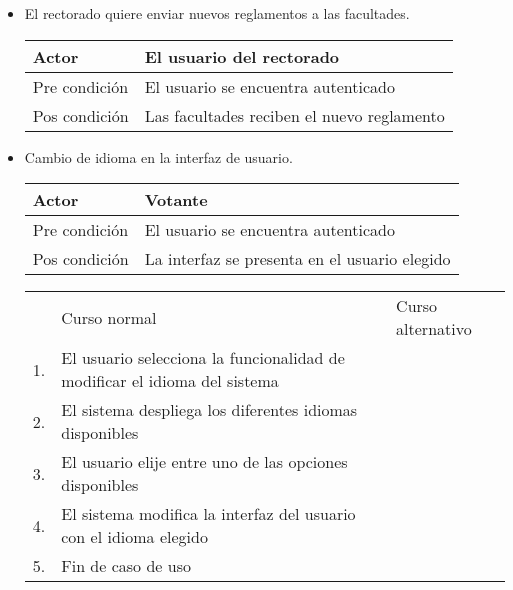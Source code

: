 \begin{itemize}
\bigskip
\item El rectorado quiere enviar nuevos reglamentos a las facultades.
\begin{center}
\begin{tabular}{ll}
Actor & El usuario del rectorado \\
\hline
Pre condici\'on & El usuario se encuentra autenticado \\
\hline
Pos condici\'on & Las facultades reciben el nuevo reglamento \\
\hline
\end{tabular}
\medskip
\end{center}

\bigskip
\item Cambio de idioma en la interfaz de usuario.
\begin{center}
\begin{tabular}{ll}
Actor & Votante \\
\hline
Pre condición & El usuario se encuentra autenticado \\
\hline
Pos condición & La interfaz se presenta en el usuario elegido \\
\hline
\end{tabular}
\medskip
\begin{tabular}{c p{4cm}|p{4cm}}
 & Curso normal & Curso alternativo \\
 1. & El usuario selecciona la funcionalidad de modificar el idioma del sistema &   \\
 2. & El sistema despliega los diferentes idiomas disponibles &   \\
 3. & El usuario elije entre uno de las opciones disponibles & \\
 4. & El sistema modifica la interfaz del usuario con el idioma elegido & \\
 5. & Fin de caso de uso & \\
\end{tabular}
\end{center}




\end{itemize}
